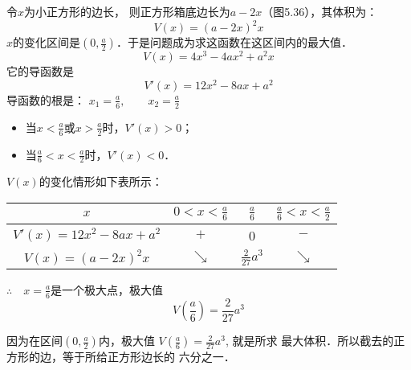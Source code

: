 \begin{figure}[htp]
    \centering

    \caption{}
\end{figure}

\begin{solution}
令$x$为小正方形的边长，
则正方形箱底边长为$a-2x$（图5.36），其体积为：
\[V(x)=(a-2x)^2x\]
$x$的变化区间是$\left(0,\frac{a}{2}\right)$．于是问题成为求这函数在这区间内的最大值．   
\[V(x)=4x^3-4ax^2+a^2x\]
它的导函数是
\[V'(x)=12x^2-8ax+a^2\]
导函数的根是：
$x_1=\frac{a}{6},\qquad x_2=\frac{a}{2}$

\begin{itemize}
    \item 当$x<\frac{a}{6}$或$x>\frac{a}{2}$时，$V'(x)>0$；
    \item 当$\frac{a}{6}<x<\frac{a}{2}$时，$V'(x)<0$．
\end{itemize}
$V(x)$的变化情形如下表所示：
\begin{center}
    \begin{tabular}{c|ccc}
\hline
$x$ & $0<x<\tfrac{a}{6}$&$\tfrac{a}{6}$& $\tfrac{a}{6}<x<\tfrac{a}{2}$\\
\hline
$V'(x)=12x^2-8ax+a^2$ & $+$ &0 &$-$\\
$V(x)=(a-2x)^2x$ &  $\searrow$& $\tfrac{2}{27}a^3$& $\searrow$\\
\hline
    \end{tabular}
\end{center}
$\therefore\quad x=\frac{a}{6}$是一个极大点，极大值
\[V\left(\frac{a}{6}\right)=\frac{2}{27}a^3\]

因为在区间$\left(0,\frac{a}{2}\right)$内，极大值
$V\left(\frac{a}{6}\right)=\frac{2}{27}a^3$, 就是所求
最大体积．所以截去的正方形的边，等于所给正方形边长的
六分之一．
\end{solution}


